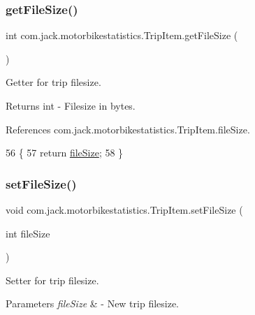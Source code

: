 \subsubsection{\texorpdfstring{get\+File\+Size()}{getFileSize()}}
{\footnotesize\ttfamily int com.\+jack.\+motorbikestatistics.\+Trip\+Item.\+get\+File\+Size (\begin{DoxyParamCaption}{ }\end{DoxyParamCaption})\hspace{0.3cm}{\ttfamily [inline]}}



Getter for trip filesize. 

\begin{DoxyReturn}{Returns}
int -\/ Filesize in bytes. 
\end{DoxyReturn}


References com.\+jack.\+motorbikestatistics.\+Trip\+Item.\+file\+Size.


\begin{DoxyCode}
56                              \{
57         \textcolor{keywordflow}{return} \hyperlink{classcom_1_1jack_1_1motorbikestatistics_1_1_trip_item_ac7b1106a5db61eb17cfd3f314a885a3d}{fileSize};
58     \}
\end{DoxyCode}
\mbox{\label{classcom_1_1jack_1_1motorbikestatistics_1_1_trip_item_a133ad3b07e6c5d57203ffdc81f6a51fc}} 
\subsubsection{\texorpdfstring{set\+File\+Size()}{setFileSize()}}
{\footnotesize\ttfamily void com.\+jack.\+motorbikestatistics.\+Trip\+Item.\+set\+File\+Size (\begin{DoxyParamCaption}\item[{int}]{file\+Size }\end{DoxyParamCaption})\hspace{0.3cm}{\ttfamily [inline]}}



Setter for trip filesize. 


\begin{DoxyParams}{Parameters}
{\em file\+Size} & -\/ New trip filesize. \\
\hline
\end{DoxyParams}


